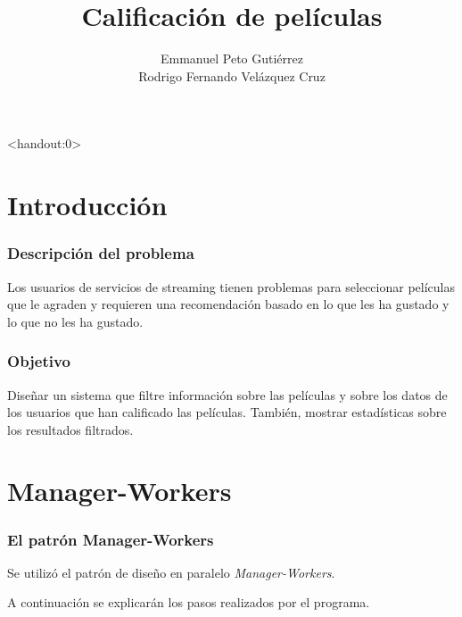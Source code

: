 \documentclass{beamer}
\title{Calificación de películas}
\author{Emmanuel Peto Gutiérrez\\Rodrigo Fernando Velázquez Cruz}
\institute{IIMAS \\ UNAM}
\begin{document}
\begin{frame}<handout:0>
\titlepage
\end{frame}

\section{Introducción}

\begin{frame}
\frametitle{Descripción del problema}

Los usuarios de servicios de streaming tienen problemas para seleccionar películas que le agraden y requieren una recomendación basado en lo que les ha gustado y lo que no les ha gustado.

\end{frame}

\begin{frame}
\frametitle{Objetivo}

Diseñar un sistema que filtre información sobre las películas y sobre los datos de los usuarios que han calificado las películas. También, mostrar estadísticas sobre los resultados filtrados.

\end{frame}

\section{Manager-Workers}

\begin{frame}
\frametitle{El patrón Manager-Workers}

Se utilizó el patrón de diseño en paralelo \textit{Manager-Workers}.

A continuación se explicarán los pasos realizados por el programa.

\end{frame}
\end{document}

